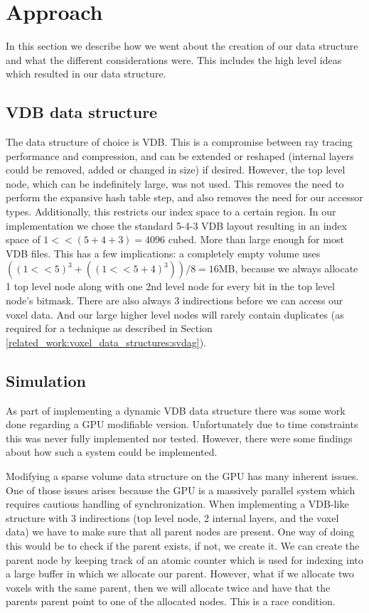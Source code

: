 \section{Approach} \label{approach}
In this section we describe how we went about the creation of our data structure and what the different considerations were. This includes the high level ideas which resulted in our data structure.
\subsection{VDB data structure} \label{approach:vdb_data_structure}
The data structure of choice is VDB. This is a compromise between ray tracing performance and compression, and can be extended or reshaped (internal layers could be removed, added or changed in size) if desired. However, the top level node, which can be indefinitely large, was not used. This removes the need to perform the expansive hash table step, and also removes the need for our accessor types. Additionally, this restricts our index space to a certain region. In our implementation we chose the standard 5-4-3 VDB layout resulting in an index space of $1 << (5+4+3) = 4096$ cubed. More than large enough for most VDB files. This has a few implications: a completely empty volume uses $((1<<5)^3+((1<<5+4)^3)) / 8 = 16$MB, because we always allocate 1 top level node along with one 2nd level node for every bit in the top level node's bitmask. There are also always 3 indirections before we can access our voxel data. And our large higher level nodes will rarely contain duplicates (as required for a technique as described in Section \ref{related_work:voxel_data_structures:svdag}).

\subsection{Simulation} \label{approach:simulation}
As part of implementing a dynamic VDB data structure there was some work done regarding a GPU modifiable version. Unfortunately due to time constraints this was never fully implemented nor tested. However, there were some findings about how such a system could be implemented.

Modifying a sparse volume data structure on the GPU has many inherent issues. One of those issues arises because the GPU is a massively parallel system which requires cautious handling of synchronization. When implementing a VDB-like structure with 3 indirections (top level node, 2 internal layers, and the voxel data) we have to make sure that all parent nodes are present. One way of doing this would be to check if the parent exists, if not, we create it. We can create the parent node by keeping track of an atomic counter which is used for indexing into a large buffer in which we allocate our parent. However, what if we allocate two voxels with the same parent, then we will allocate twice and have that the parents parent point to one of the allocated nodes. This is a race condition.

